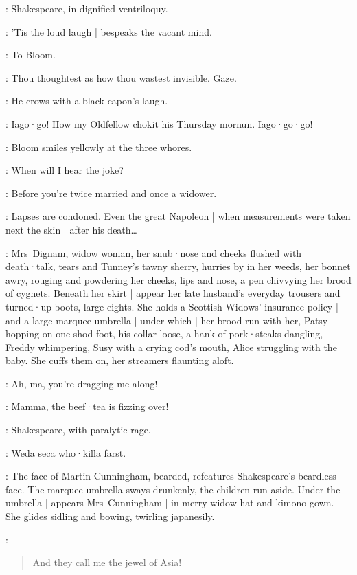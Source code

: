 :
Shakespeare,
in dignified ventriloquy.

\Shakespeare:
'Tis the loud laugh |
bespeaks the vacant mind.

:
To Bloom.

\Shakespeare:
Thou thoughtest as how thou wastest invisible.
Gaze.

:
He crows with a black capon's laugh.

\Shakespeare:
Iago·go!
How my Oldfellow chokit his Thursday mornun.
Iago·go·go!

:
Bloom smiles yellowly at the three whores.

\Bloom:
When will I hear the joke?

\Zoe:
Before you're twice married and once a widower.

\Bloom:
Lapses are condoned.
Even the great Napoleon |
when measurements were taken next the skin |
after his death…

:
Mrs~Dignam,
widow woman,
her snub·nose and cheeks flushed with death·talk,
tears and Tunney's tawny sherry,
hurries by in her weeds,
her bonnet awry,
rouging and powdering her cheeks,
lips and nose,
a pen chivvying her brood of cygnets.
%
Beneath her skirt |
appear her late husband's everyday trousers and turned·up boots,
large eights.
She holds a Scottish Widows' insurance policy |
and a large marquee umbrella |
under which |
her brood run with her,
Patsy hopping on one shod foot,
his collar loose,
a hank of pork·steaks dangling,
Freddy whimpering,
Susy with a crying cod's mouth,
Alice struggling with the baby.
She cuffs them on,
her streamers flaunting aloft.

\Freddy[1]:
Ah,
ma,
you're dragging me along!

\Susy[2]:
Mamma,
the beef·tea is fizzing over!

:
Shakespeare,
with paralytic rage.

\Shakespeare:
Weda seca who·killa farst.

:
The face of Martin Cunningham,
bearded,
refeatures Shakespeare's beardless face.
The marquee umbrella sways drunkenly,
the children run aside.
Under the umbrella |
appears Mrs~Cunningham |
in merry widow hat and kimono gown.
She glides sidling and bowing,
twirling japanesily.

\MrsCunningham:
\begin{verse}
    And they call me the jewel of Asia!
\end{verse}


